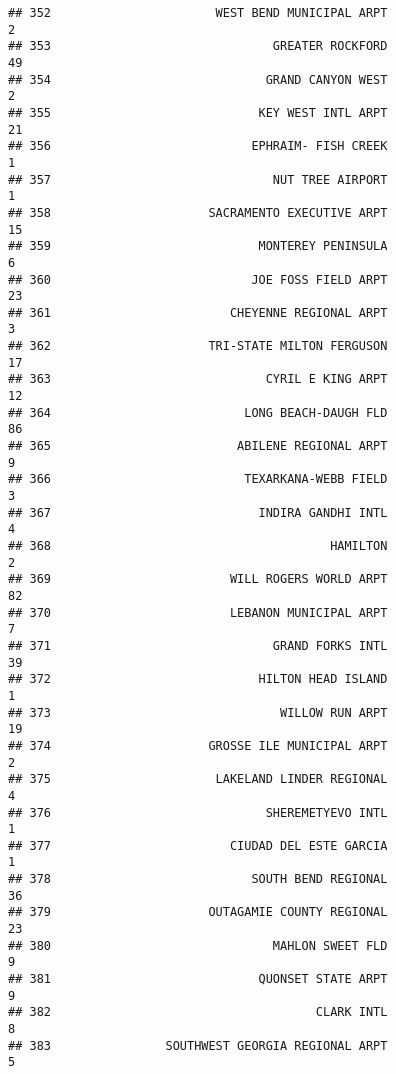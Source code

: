 \documentclass[
]{article}
\begin{document}
\begin{verbatim}
## 352                       WEST BEND MUNICIPAL ARPT                           2
## 353                               GREATER ROCKFORD                          49
## 354                              GRAND CANYON WEST                           2
## 355                             KEY WEST INTL ARPT                          21
## 356                            EPHRAIM- FISH CREEK                           1
## 357                               NUT TREE AIRPORT                           1
## 358                      SACRAMENTO EXECUTIVE ARPT                          15
## 359                             MONTEREY PENINSULA                           6
## 360                            JOE FOSS FIELD ARPT                          23
## 361                         CHEYENNE REGIONAL ARPT                           3
## 362                      TRI-STATE MILTON FERGUSON                          17
## 363                              CYRIL E KING ARPT                          12
## 364                           LONG BEACH-DAUGH FLD                          86
## 365                          ABILENE REGIONAL ARPT                           9
## 366                           TEXARKANA-WEBB FIELD                           3
## 367                             INDIRA GANDHI INTL                           4
## 368                                       HAMILTON                           2
## 369                         WILL ROGERS WORLD ARPT                          82
## 370                         LEBANON MUNICIPAL ARPT                           7
## 371                               GRAND FORKS INTL                          39
## 372                             HILTON HEAD ISLAND                           1
## 373                                WILLOW RUN ARPT                          19
## 374                      GROSSE ILE MUNICIPAL ARPT                           2
## 375                       LAKELAND LINDER REGIONAL                           4
## 376                              SHEREMETYEVO INTL                           1
## 377                         CIUDAD DEL ESTE GARCIA                           1
## 378                            SOUTH BEND REGIONAL                          36
## 379                      OUTAGAMIE COUNTY REGIONAL                          23
## 380                               MAHLON SWEET FLD                           9
## 381                             QUONSET STATE ARPT                           9
## 382                                     CLARK INTL                           8
## 383                SOUTHWEST GEORGIA REGIONAL ARPT                           5

\end{verbatim}
\end{document}
